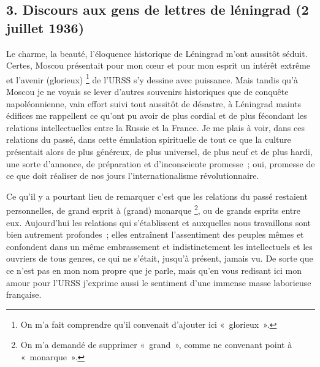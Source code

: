 \documentclass[french,twoside]{book} %
\begin{document}
\subsection[{3. Discours aux gens de lettres de léningrad (2 juillet 1936)}]{3. Discours aux gens de lettres de léningrad (2 juillet 1936)}
\noindent Le charme, la beauté, l’éloquence historique de Léningrad m’ont aussitôt séduit. Certes, Moscou présentait pour mon cœur et pour mon esprit un intérêt extrême et l’avenir (glorieux) \footnote{On m’a fait comprendre qu’il convenait d’ajouter ici « glorieux ».} de l’URSS s’y dessine avec puissance. Mais tandis qu’à Moscou je ne voyais se lever d’autres souvenirs historiques que de conquête napoléonnienne, vain effort suivi tout aussitôt de désastre, à Léningrad maints édifices me rappellent ce qu’ont pu avoir de plus cordial et de plus fécondant les relations intellectuelles entre la Russie et la France. Je me plais à voir, dans ces relations du passé, dans cette émulation spirituelle de tout ce que la culture présentait alors de plus généreux, de plus universel, de plus neuf et de plus hardi, une sorte d’annonce, de préparation et d’inconsciente promesse ; oui, promesse de ce que doit réaliser de nos jours l’internationalisme révolutionnaire.\par
Ce qu’il y a pourtant lieu de remarquer c’est que les relations du passé restaient personnelles, de grand esprit à (grand) monarque \footnote{On m’a demandé de supprimer « grand », comme ne convenant point à « monarque ».}, ou de grands esprits entre eux. Aujourd’hui les relations qui s’établissent et auxquelles nous travaillons sont bien autrement profondes ; elles entraînent l’assentiment des peuples mêmes et confondent dans un même embrassement et indistinctement les intellectuels et les ouvriers de tous genres, ce qui ne s’était, jusqu’à présent, jamais vu. De sorte que ce n’est pas en mon nom propre que je parle, mais qu’en vous redisant ici mon amour pour l’URSS j’exprime aussi le sentiment d’une immense masse laborieuse française.\par
\end{document}
